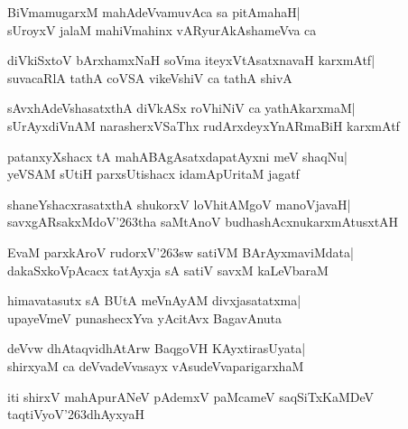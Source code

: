 \documentclass[twoside,12pt,openright]{book}
\def\S{\char'263}
\newcounter{shloka}[chapter]
\begin{document}
\begin{shloka}%
BiVmamugarxM mahAdeVvamuvAca sa pitAmahaH|\\
sUroyxV jalaM mahiVmahinx vARyurAkAshameVva ca
\end{shloka}

\begin{shloka}%
diVkiSxtoV bArxhamxNaH soVma iteyxVtAsatxnavaH karxmAtf|\\
suvacaRlA tathA coVSA vikeVshiV ca tathA shivA
\end{shloka}

\begin{shloka}%
sAvxhAdeVshasatxthA diVkASx roVhiNiV ca yathAkarxmaM|\\
sUrAyxdiVnAM narasherxVSaThx rudArxdeyxYnARmaBiH karxmAtf
\end{shloka}

\begin{shloka}%
patanxyXshacx tA mahABAgAsatxdapatAyxni meV shaqNu|\\
yeVSAM sUtiH parxsUtishacx idamApUritaM jagatf
\end{shloka}

\begin{shloka}%
shaneYshacxrasatxthA shukorxV loVhitAMgoV manoVjavaH|\\
savxgARsakxMdoV\S tha saMtAnoV budhashAcxnukarxmAtusxtAH
\end{shloka}

\begin{shloka}%
EvaM parxkAroV rudorxV\S sw satiVM BArAyxmaviMdata|\\
dakaSxkoVpAcacx tatAyxja sA satiV savxM kaLeVbaraM
\end{shloka}

\begin{shloka}%
himavatasutx sA BUtA meVnAyAM divxjasatatxma|\\
upayeVmeV punashecxYva yAcitAvx BagavAnuta 
\end{shloka}

\begin{shloka}%
deVvw dhAtaqvidhAtArw BaqgoVH KAyxtirasUyata|\\
shirxyaM ca deVvadeVvasayx vAsudeVvaparigarxhaM 
\end{shloka}

\begin{center}
iti shirxV mahApurANeV pAdemxV paMcameV saqSiTxKaMDeV \\
taqtiVyoV\S dhAyxyaH
\end{center}
\end{document}
